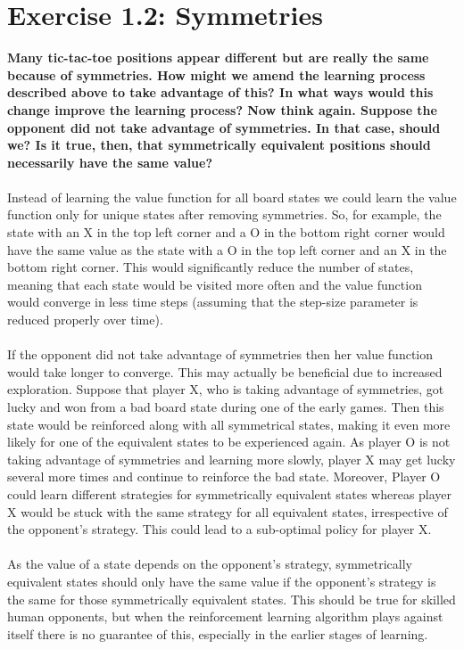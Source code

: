 \documentclass[a4paper,11pt]{article}
\numberwithin{equation}{section}
\theoremstyle{remark}
\begin{document}
\section{Exercise 1.2: Symmetries}

\textbf{Many tic-tac-toe positions appear different but are really the same because of symmetries. How might we amend the learning process described above to take advantage of this? In what ways would this change improve the learning process? Now think again. Suppose the opponent did not take advantage of symmetries. In that case, should we? Is it true, then, that symmetrically equivalent positions should necessarily have the same value?}
\\ \\
Instead of learning the value function for all board states we could learn the value function only for unique states after removing symmetries. So, for example, the state with an X in the top left corner and a O in the bottom right corner would have the same value as the state with a O in the top left corner and an X in the bottom right corner. This would significantly reduce the number of states, meaning that each state would be visited more often and the value function would converge in less time steps (assuming that the step-size parameter is reduced properly over time).  
\\ \\
If the opponent did not take advantage of symmetries then her value function would take longer to converge. This may actually be beneficial due to increased exploration. Suppose that player X, who is taking advantage of symmetries, got lucky and won from a bad board state during one of the early games. Then this state would be reinforced along with all symmetrical states, making it even more likely for one of the equivalent states to be experienced again. As player O is not taking advantage of symmetries and learning more slowly, player X may get lucky several more times and continue to reinforce the bad state. Moreover, Player O could learn different strategies for symmetrically equivalent states whereas player X would be stuck with the same strategy for all equivalent states, irrespective of the opponent's strategy. This could lead to a sub-optimal policy for player X. 
\\ \\
As the value of a state depends on the opponent's strategy, symmetrically equivalent states should only have the same value if the opponent's strategy is the same for those symmetrically equivalent states. This should be true for skilled human opponents, but when the reinforcement learning algorithm plays against itself there is no guarantee of this, especially in the earlier stages of learning.  
 
\end{document}
